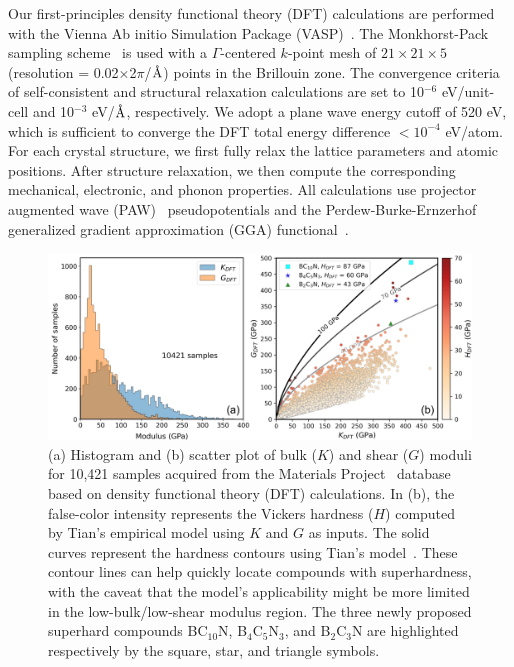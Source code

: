	Our first-principles density functional theory (DFT) calculations are performed with the Vienna Ab initio Simulation Package (VASP)~\cite{kresse1996efficiency,kresse1996efficient}.
	The Monkhorst-Pack sampling scheme~\cite{monkhorst1976special} is used with a $\Gamma$-centered $k$-point mesh of $21\times 21 \times 5$ (resolution = 0.02$\times$2$\pi$/$\text{\normalfont\AA}$) points in the Brillouin zone.
	The convergence criteria of self-consistent and structural relaxation calculations are set to 10$^{-6}$ eV/unit-cell and 10$^{-3}$ eV/$\text{\normalfont\AA}$, respectively.
	We adopt a plane wave energy cutoff of 520 eV, which is sufficient to converge the DFT total energy difference $< 10^{-4}$ eV/atom.
	For each crystal structure, we first fully relax the lattice parameters and atomic positions.
	After structure relaxation, we then compute the corresponding mechanical, electronic, and phonon properties.
	All calculations use projector augmented wave (PAW)~\cite{PAW_1, PAW_2} pseudopotentials and the Perdew-Burke-Ernzerhof generalized gradient approximation (GGA) functional~\cite{perdew1996generalized}.

	\begin{figure}[htbp!]
        \centering
        \captionsetup{singlelinecheck = false, justification=justified}
        \includegraphics[width=1.0\textwidth]{BCN_2_data.png}
        \caption[Data distribution of bulk and shear moduli for B-C-N systems.]{(a) Histogram and (b) scatter plot of bulk ($K$) and shear ($G$) moduli for 10,421 samples acquired from the Materials Project~\cite{MP} database based on density functional theory (DFT) calculations. In (b), the false-color intensity represents the Vickers hardness ($H$) computed by Tian's empirical model using $K$ and $G$ as inputs. The solid curves represent the hardness contours using Tian's model~\cite{tian2012microscopic}.
		These contour lines can help quickly locate compounds with superhardness, with the caveat that the model's applicability might be more limited in the low-bulk/low-shear modulus region.
		The three newly proposed superhard compounds BC$_{10}$N, B$_4$C$_5$N$_3$, and B$_2$C$_3$N are highlighted respectively by the square, star, and triangle symbols.}
        \label{BCN_2_data}
    \end{figure}
    
